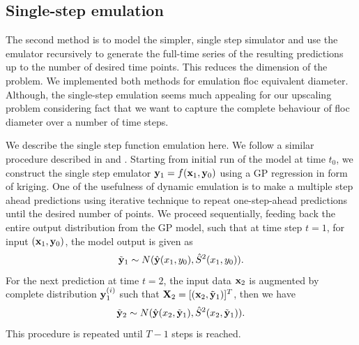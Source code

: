 \documentclass[12pt,titlepage]{report}
\newcommand{\bx}{{\bf x}}
\newcommand{\bX}{{\bf X}}
\newcommand{\by}{{\bf y}}
\newcommand{\tby}{{\tilde {\bf y}}}
\newcommand{\hby}{{\hat {\bf y}}}
\theoremstyle{definition}
\theoremstyle{remark}
\begin{document}
\subsection{Single-step emulation}
The second method is to model the simpler, single step simulator and use the emulator recursively to generate the full-time series of the resulting predictions up to the number of desired time points. This reduces the dimension of the problem. We implemented both methods for emulation floc equivalent diameter. Although, the single-step emulation seems much appealing for our upscaling problem considering fact that we want to capture the complete behaviour of floc diameter over a number of time steps.

We describe the single step function emulation here. We follow a similar procedure described in \citet{pd12} and \citet{pd17}. Starting from initial run of the model at time $t_0$, we construct the single step emulator $\by_1 = f(\bx_1, \by_{0})$ using  a GP regression in form of kriging. One of the usefulness of dynamic emulation is to make a multiple step ahead predictions using iterative technique to repeat one-step-ahead predictions until the desired number of points. We proceed sequentially, feeding back the entire output distribution from the GP model, such that at time step $t=1$, for input $(\bx_1,\by_0)$, the model output is given as $$\tby_1 \sim N(\hby(x_1,y_0), \hat S^2(x_1,y_0)).$$
For the next prediction at time $t=2$, the input data $\bx_2$ is augmented by complete distribution $\by^{(i)}_1$ such that $\bX_2=[(\bx_2,\tby_1)]^T$, then we have $$\tby_2 \sim N(\hby(x_2,\tby_1), \hat S^2(x_2,\tby_1)).$$ This procedure is repeated until $T-1$ steps is reached.
\end{document}
